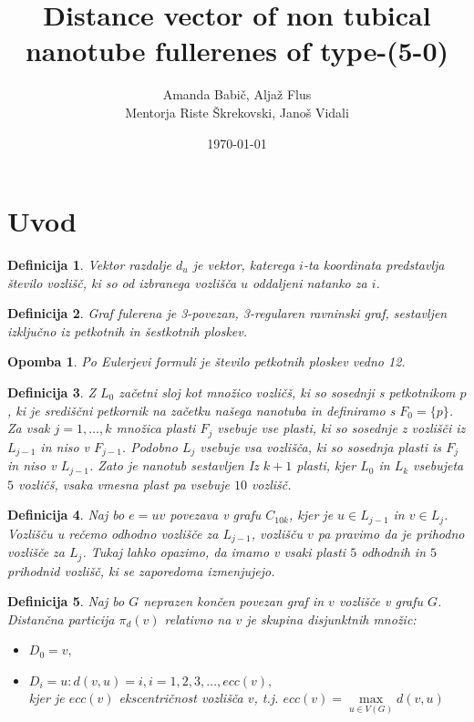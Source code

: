 \documentclass[a4paper, 12pt]{article}
\title{
    Distance vector of non tubical nanotube fullerenes of type-(5-0)
}
\author{Amanda Babič, Aljaž Flus \\
        {\small Mentorja Riste Škrekovski, Janoš Vidali}}
\date{\today}
\newtheorem{definicija}{Definicija}[section]
\newtheorem{opomba}{Opomba}[section]
\begin{document}
\maketitle

\newpage

\section{Uvod}

\begin{definicija}
    Vektor razdalje $d_{u}$ je vektor, katerega $i$-ta koordinata predstavlja število vozlišč, ki so od izbranega vozlišča $u$ oddaljeni natanko za $i$. 
\end{definicija}

\begin{definicija}
    Graf fulerena je 3-povezan, 3-regularen ravninski graf, sestavljen izključno iz petkotnih in šestkotnih ploskev.
\end{definicija}

\begin{opomba}
    Po Eulerjevi formuli je število petkotnih ploskev vedno 12.
\end{opomba}

\begin{definicija}
    Z $L_{0}$ začetni sloj kot množico vozličš, ki so sosednji s petkotnikom $p$, ki je središčni petkornik na začetku našega nanotuba 
    in definiramo s $F_0 = \{p\}$. Za vsak $j = 1, \dots , k$ množica plasti $F_j$ vsebuje vse plasti, ki so sosednje z vozlišči iz $L_{j-1}$ 
    in niso v $F_{j-1}$. Podobno $L_j$ vsebuje vsa vozlišča, ki so sosednja plasti is $F_j$ in niso v $L_{j-1}$. Zato je nanotub sestavljen Iz 
    $k+1$ plasti, kjer $L_0$ in $L_{k}$ vsebujeta $5$ vozličš, vsaka vmesna plast pa vsebuje $10$ vozlišč.
\end{definicija}

\begin{definicija}
    Naj bo $e = uv$ povezava v grafu $C_{10k}$, kjer je $u \in L_{j-1}$ in $v \in L_j$. Vozlišču u rečemo odhodno vozlišče za $L_{j-1}$, 
    vozlišču $v$ pa pravimo da je prihodno vozlišče za $L_j$. Tukaj lahko opazimo, da imamo v vsaki plasti $5$ odhodnih in $5$ prihodnid vozlišč,
    ki se zaporedoma izmenjujejo.
\end{definicija}

\begin{definicija}
    Naj bo $G$ neprazen končen povezan graf in $v$ vozlišče v grafu $G$. Distančna particija $\pi_{d}(v)$ 
    relativno na $v$ je skupina disjunktnih množic:
    \begin{itemize}
        \item $D_{0} = {v},$
        \item $D_{i} = {u : d(v,u) = i}, i= 1,2,3, \dots , ecc(v),$ \\
        kjer je $ecc(v)$ ekscentričnost vozlišča $v$, t.j. $ecc(v) = \max\limits_{u \in V(G)} d(v,u)$

    \end{itemize}
\end{definicija}
\end{document}

